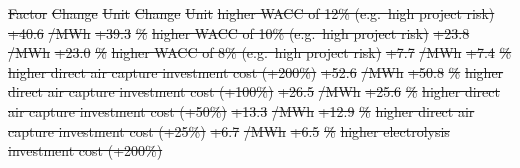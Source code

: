 \documentclass[5p,9pt,draft]{elsarticle}
\providecommand{\DIFdeltex}[1]{{\protect\color{red}\sout{#1}}}                      %
\providecommand{\DIFdelFL}[1]{\DIFdel{#1}} %
\providecommand{\DIFdel}[1]{\texorpdfstring{\DIFdeltex{#1}}{}} %
\begin{document}
\DIFdelFL{Factor }%
\DIFdelFL{Change }%
\DIFdelFL{Unit }%
\DIFdelFL{Change }%
\DIFdelFL{Unit}%
\DIFdelFL{higher WACC of 12\% (e.g.~high project risk) }%
\DIFdelFL{+40.6 }%
\DIFdelFL{/MWh  }%
\DIFdelFL{+39.3 }%
\DIFdelFL{\% }%
\DIFdelFL{higher WACC of 10\% (e.g.~high project risk) }%
\DIFdelFL{+23.8 }%
\DIFdelFL{/MWh  }%
\DIFdelFL{+23.0 }%
\DIFdelFL{\% }%
\DIFdelFL{higher WACC of 8\% (e.g.~high project risk) }%
\DIFdelFL{+7.7 }%
\DIFdelFL{/MWh  }%
\DIFdelFL{+7.4 }%
\DIFdelFL{\% }%
\DIFdelFL{higher direct air capture investment cost (+200\%) }%
\DIFdelFL{+52.6 }%
\DIFdelFL{/MWh  }%
\DIFdelFL{+50.8 }%
\DIFdelFL{\% }%
\DIFdelFL{higher direct air capture investment cost (+100\%) }%
\DIFdelFL{+26.5 }%
\DIFdelFL{/MWh  }%
\DIFdelFL{+25.6 }%
\DIFdelFL{\% }%
\DIFdelFL{higher direct air capture investment cost (+50\%) }%
\DIFdelFL{+13.3 }%
\DIFdelFL{/MWh  }%
\DIFdelFL{+12.9 }%
\DIFdelFL{\% }%
\DIFdelFL{higher direct air capture investment cost (+25\%) }%
\DIFdelFL{+6.7 }%
\DIFdelFL{/MWh  }%
\DIFdelFL{+6.5 }%
\DIFdelFL{\% }%
\DIFdelFL{higher electrolysis investment cost (+200\%) }%
\end{document}
